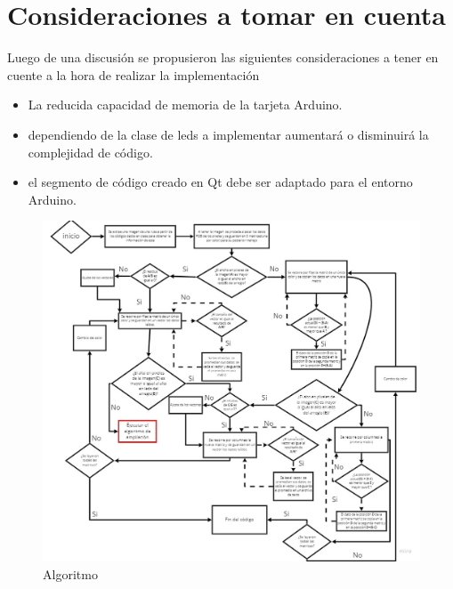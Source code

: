 \documentclass{article}
\begin{document}
	\section{Consideraciones a tomar en cuenta}
	Luego de una discusión se propusieron las siguientes consideraciones a tener en cuente a la hora de realizar la implementación
	\begin{itemize}
	    \item La reducida capacidad de memoria de la tarjeta Arduino.
	    \item dependiendo de la clase de leds a implementar aumentará o disminuirá la complejidad de código. 
	    \item el segmento de código creado en Qt debe ser adaptado para el entorno Arduino.
	\end{itemize}
	\begin{figure}[h]
	\includegraphics[width=12cm]{circuitando (7).jpg}
	\centering
	\caption{Algoritmo}
	\label{fig:figura 3}
	\end{figure}
	
\end{document}
